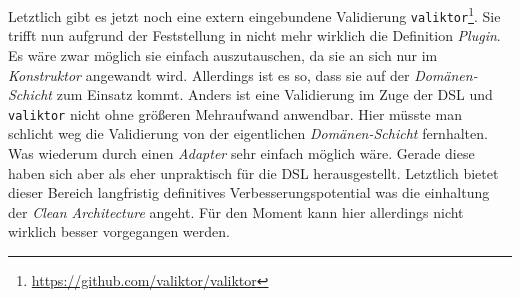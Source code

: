 Letztlich gibt es jetzt noch eine extern eingebundene Validierung \texttt{valiktor}\footnote{\url{https://github.com/valiktor/valiktor}}.
Sie trifft nun aufgrund der Feststellung in  nicht mehr wirklich die Definition \emph{Plugin}.
Es wäre zwar möglich sie einfach auszutauschen, da sie an sich nur im \emph{Konstruktor} angewandt wird.
Allerdings ist es so, dass sie auf der \emph{Domänen-Schicht} zum Einsatz kommt.
Anders ist eine Validierung im Zuge der DSL und \texttt{valiktor} nicht ohne größeren Mehraufwand anwendbar.
Hier müsste man schlicht weg die Validierung von der eigentlichen \emph{Domänen-Schicht} fernhalten. 
Was wiederum durch einen \emph{Adapter} sehr einfach möglich wäre.
Gerade diese haben sich aber als eher unpraktisch für die DSL herausgestellt.
Letztlich bietet dieser Bereich langfristig definitives Verbesserungspotential was die einhaltung der \emph{Clean Architecture} angeht.
Für den Moment kann hier allerdings nicht wirklich besser vorgegangen werden.